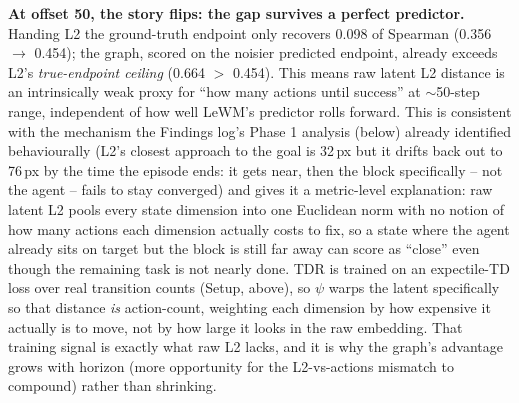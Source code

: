 \documentclass[11pt]{article}
\begin{document}
\textbf{At offset 50, the story flips: the gap survives a perfect predictor.} Handing L2 the
ground-truth endpoint only recovers 0.098 of Spearman (0.356 $\to$ 0.454); the graph, scored
on the noisier predicted endpoint, already exceeds L2's \emph{true-endpoint ceiling}
(0.664 $>$ 0.454). This means raw latent L2 distance is an intrinsically weak proxy for
``how many actions until success'' at $\sim$50-step range, independent of how well LeWM's
predictor rolls forward. This is consistent with the mechanism the Findings log's Phase 1
analysis (below) already identified behaviourally (L2's closest approach to the goal is 32\,px but it
drifts back out to 76\,px by the time the episode ends: it gets near, then the block
specifically -- not the agent -- fails to stay converged) and gives it a metric-level
explanation: raw latent L2 pools every state dimension into one Euclidean norm with no notion
of how many actions each dimension actually costs to fix, so a state where the agent already
sits on target but the block is still far away can score as ``close'' even though the
remaining task is not nearly done. TDR is trained on an expectile-TD loss over real transition
counts (Setup, above), so $\psi$ warps the latent specifically so that distance
\emph{is} action-count, weighting each dimension by how expensive it actually is to move, not
by how large it looks in the raw embedding. That training signal is exactly what raw L2 lacks,
and it is why the graph's advantage grows with horizon (more opportunity for the L2-vs-actions
mismatch to compound) rather than shrinking.
\end{document}
